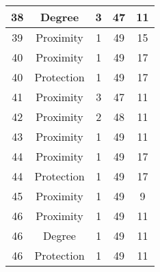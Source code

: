 \documentclass[results.tex]{subfiles}
\begin{document}
\begin{center}
\begin{tabular}{| c || c | c | c | c |}
            \hline
            38                      & Degree                       & 3                      & 47                      & 11                   \\
            \hline
            39                      & Proximity                    & 1                      & 49                      & 15                   \\
            \hline
            40                      & Proximity                    & 1                      & 49                      & 17                   \\
            \hline
            40                      & Protection                   & 1                      & 49                      & 17                   \\
            \hline
            41                      & Proximity                    & 3                      & 47                      & 11                   \\
            \hline
            42                      & Proximity                    & 2                      & 48                      & 11                   \\
            \hline
            43                      & Proximity                    & 1                      & 49                      & 11                   \\
            \hline
            44                      & Proximity                    & 1                      & 49                      & 17                   \\
            \hline
            44                      & Protection                   & 1                      & 49                      & 17                   \\
            \hline
            45                      & Proximity                    & 1                      & 49                      & 9                    \\
            \hline
            46                      & Proximity                    & 1                      & 49                      & 11                   \\
            \hline
            46                      & Degree                       & 1                      & 49                      & 11                   \\
            \hline
            46                      & Protection                   & 1                      & 49                      & 11                   \\

\end{tabular}
\end{center}
\end{document}

